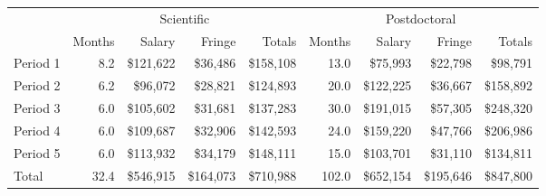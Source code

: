 \begin{tabular}{lrrrr|rrrr}
\hline
 & \multicolumn{4}{c|}{Scientific} & \multicolumn{4}{c}{Postdoctoral} \\
{} & Months & Salary & Fringe & Totals & Months & Salary & Fringe & Totals \\
\hline
Period 1 &       8.2 &    \$121,622 &      \$36,486 &  \$158,108 &           13.0 &          \$75,993 &           \$22,798 &        \$98,791 \\
Period 2 &       6.2 &     \$96,072 &      \$28,821 &  \$124,893 &           20.0 &         \$122,225 &           \$36,667 &       \$158,892 \\
Period 3 &       6.0 &    \$105,602 &      \$31,681 &  \$137,283 &           30.0 &         \$191,015 &           \$57,305 &       \$248,320 \\
Period 4 &       6.0 &    \$109,687 &      \$32,906 &  \$142,593 &           24.0 &         \$159,220 &           \$47,766 &       \$206,986 \\
Period 5 &       6.0 &    \$113,932 &      \$34,179 &  \$148,111 &           15.0 &         \$103,701 &           \$31,110 &       \$134,811 \\
\hline
Total    &      32.4 &    \$546,915 &     \$164,073 &  \$710,988 &          102.0 &         \$652,154 &          \$195,646 &       \$847,800 \\
\hline
\end{tabular}
